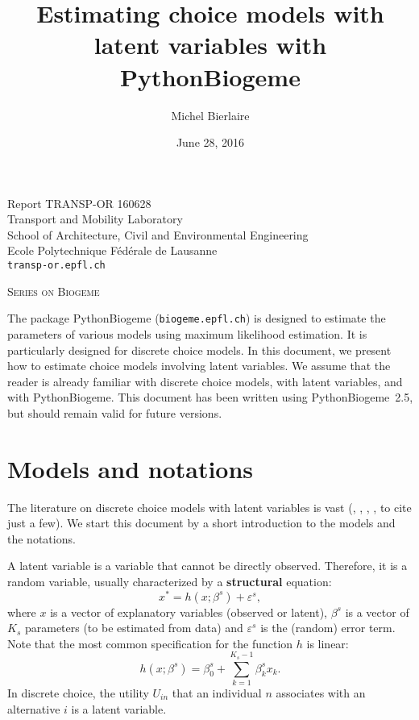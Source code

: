 \documentclass[12pt,a4paper]{article}
\title{Estimating choice models with latent variables with PythonBiogeme}
\author{Michel Bierlaire}
\date{June 28, 2016}
\newcommand{\PBIOGEME}{PythonBiogeme}
\begin{document}
\begin{titlepage}
\pagestyle{empty}

\maketitle
\vspace{2cm}

\begin{center}
\small Report TRANSP-OR 160628 \\ Transport and Mobility Laboratory \\ School of Architecture, Civil and Environmental Engineering \\ Ecole Polytechnique F\'ed\'erale de Lausanne \\ \verb+transp-or.epfl.ch+
\begin{center}
\textsc{Series on Biogeme}
\end{center}
\end{center}


\clearpage
\end{titlepage}

The package PythonBiogeme (\texttt{biogeme.epfl.ch}) is designed to
estimate the parameters of various models using maximum likelihood
estimation. It is particularly designed for discrete choice models. In
this document, we present how to estimate choice models involving
latent variables. We assume that the reader is already familiar with
discrete choice models, with latent variables, and with \PBIOGEME.
 This document has been written using
\PBIOGEME\ 2.5, but should remain valid for future versions.  

\section{Models and notations}

The literature on discrete choice models with latent variables is vast
(\cite{walker2001extended}, \cite{ashok2002extending},
\cite{greene2003latent}, \cite{ben2002integration}, to cite just a
few). We start this document by a short introduction to the models and
the notations. 

A latent variable is a variable that cannot be directly
observed. Therefore, it is a random variable,
 usually characterized by a \textbf{structural} equation:
\begin{equation}
\label{eq:structural}
x^* = h(x;\beta^s) + \varepsilon^s,
\end{equation}
where $x$ is a vector of  explanatory variables (observed or latent), $\beta^s$ is
a vector of $K_s$ parameters (to be estimated from data) and $\varepsilon^s$
is the (random) error term. Note that the most common specification
for the function $h$ is linear:
\begin{equation}
h(x;\beta^s) = \beta_0^s + \sum_{k=1}^{K_s-1} \beta^s_k x_k.
\end{equation}
 In discrete choice, the utility $U_{in}$ that an individual $n$
 associates with an alternative $i$ is a latent variable.
\end{document}
